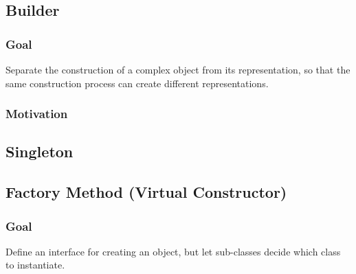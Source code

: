 \documentclass{article}
\begin{document}
\subsection{Builder}
\subsubsection{Goal}
Separate the construction of a complex object from its representation, so that the same construction process can create different representations.

\subsubsection{Motivation}

\subsection{Singleton}

\subsection{Factory Method (Virtual Constructor)}
\subsubsection{Goal}
Define an interface for creating an object, but let sub-classes decide which class to instantiate.

\clearpage






\nocite{*}
\end{document}
